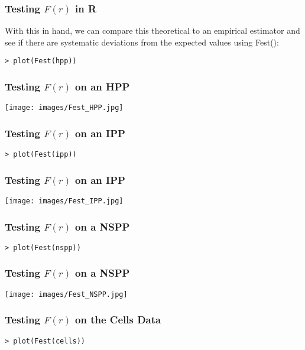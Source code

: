 \documentclass{beamer}
\begin{document}
\begin{frame}[fragile]
	\frametitle{Testing $F(r)$ in R}

	With this in hand, we can compare this theoretical to an empirical estimator and see if there are systematic deviations from the expected values using Fest():

	\begin{verbatim}
> plot(Fest(hpp))
	\end{verbatim}
\end{frame}

\begin{frame}[fragile]
	\frametitle{Testing $F(r)$ on an HPP}

	\begin{center}
		\texttt{[image: images/Fest\_HPP.jpg]}
	\end{center}
\end{frame}

\begin{frame}[fragile]
	\frametitle{Testing $F(r)$ on an IPP}

	\begin{verbatim}
> plot(Fest(ipp))
	\end{verbatim}
\end{frame}

\begin{frame}[fragile]
	\frametitle{Testing $F(r)$ on an IPP}

	\begin{center}
		\texttt{[image: images/Fest\_IPP.jpg]}
	\end{center}
\end{frame}

\begin{frame}[fragile]
	\frametitle{Testing $F(r)$ on a NSPP}

	\begin{verbatim}
> plot(Fest(nspp))
	\end{verbatim}
\end{frame}

\begin{frame}[fragile]
	\frametitle{Testing $F(r)$ on a NSPP}

	\begin{center}
		\texttt{[image: images/Fest\_NSPP.jpg]}
	\end{center}
\end{frame}

\begin{frame}[fragile]
	\frametitle{Testing $F(r)$ on the Cells Data}

	\begin{verbatim}
> plot(Fest(cells))
	\end{verbatim}
\end{frame}
\end{document}
